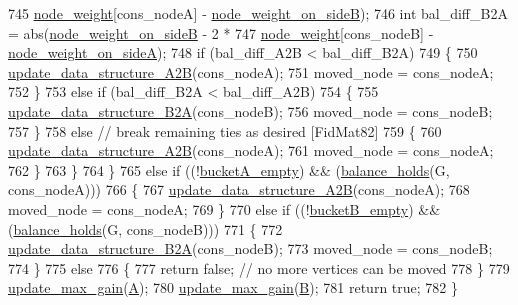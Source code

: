 \begin{DoxyCode}
745         \mbox{\hyperlink{classfm__partition_ae1ba643b4bd6721075ab7b608bcf3cd6}{node\_weight}}[cons\_nodeA] - \mbox{\hyperlink{classfm__partition_a6dc967e385b31096a85f17c51f1f0824}{node\_weight\_on\_sideB}});
746         \textcolor{keywordtype}{int} bal\_diff\_B2A = abs(\mbox{\hyperlink{classfm__partition_a6dc967e385b31096a85f17c51f1f0824}{node\_weight\_on\_sideB}} - 2 *
747         \mbox{\hyperlink{classfm__partition_ae1ba643b4bd6721075ab7b608bcf3cd6}{node\_weight}}[cons\_nodeB] - \mbox{\hyperlink{classfm__partition_a8a50d15b399c9ed35d6987c8fb68aa2b}{node\_weight\_on\_sideA}});
748         \textcolor{keywordflow}{if} (bal\_diff\_A2B < bal\_diff\_B2A)
749         \{
750         \mbox{\hyperlink{classfm__partition_a8bd7f2715334e9ec95da8001117fdde5}{update\_data\_structure\_A2B}}(cons\_nodeA);
751         moved\_node = cons\_nodeA;
752         \}
753         \textcolor{keywordflow}{else} \textcolor{keywordflow}{if} (bal\_diff\_B2A < bal\_diff\_A2B)
754         \{
755         \mbox{\hyperlink{classfm__partition_a783174f29d49e7e1ae7f6cf71faa82fb}{update\_data\_structure\_B2A}}(cons\_nodeB);
756         moved\_node = cons\_nodeB;
757         \}
758         \textcolor{keywordflow}{else}    \textcolor{comment}{// break remaining ties as desired [FidMat82]}
759         \{
760         \mbox{\hyperlink{classfm__partition_a8bd7f2715334e9ec95da8001117fdde5}{update\_data\_structure\_A2B}}(cons\_nodeA);
761         moved\_node = cons\_nodeA;
762         \}
763     \}
764     \}
765     \textcolor{keywordflow}{else} \textcolor{keywordflow}{if} ((!\mbox{\hyperlink{classfm__partition_a4df2f0f6f4686ba187c2be39ce3b29cc}{bucketA\_empty}}) && (\mbox{\hyperlink{classfm__partition_a6dc702df474c4ce60e80b3e5a93b7f4d}{balance\_holds}}(G, cons\_nodeA)))
766     \{
767     \mbox{\hyperlink{classfm__partition_a8bd7f2715334e9ec95da8001117fdde5}{update\_data\_structure\_A2B}}(cons\_nodeA);
768     moved\_node = cons\_nodeA;
769     \}
770     \textcolor{keywordflow}{else} \textcolor{keywordflow}{if} ((!\mbox{\hyperlink{classfm__partition_aef7d0f91cb7c04b4f5b1b14cc9884c37}{bucketB\_empty}}) && (\mbox{\hyperlink{classfm__partition_a6dc702df474c4ce60e80b3e5a93b7f4d}{balance\_holds}}(G, cons\_nodeB)))
771     \{
772     \mbox{\hyperlink{classfm__partition_a783174f29d49e7e1ae7f6cf71faa82fb}{update\_data\_structure\_B2A}}(cons\_nodeB);
773     moved\_node = cons\_nodeB;
774     \}
775     \textcolor{keywordflow}{else}
776     \{
777     \textcolor{keywordflow}{return} \textcolor{keyword}{false};   \textcolor{comment}{// no more vertices can be moved}
778     \}
779     \mbox{\hyperlink{classfm__partition_a335722b73c1d6f02d1083e76a3937b01}{update\_max\_gain}}(\mbox{\hyperlink{classfm__partition_a738e75c601403754e61e6dac623fd3ab}{A}});
780     \mbox{\hyperlink{classfm__partition_a335722b73c1d6f02d1083e76a3937b01}{update\_max\_gain}}(\mbox{\hyperlink{classfm__partition_a42515c44eecb7ba3e2ec549a877ef238}{B}});
781     \textcolor{keywordflow}{return} \textcolor{keyword}{true};
782 \}
\end{DoxyCode}
